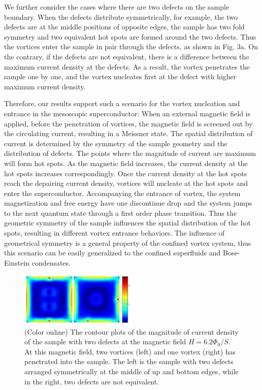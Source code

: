 \documentclass[aps,prl,showpacs,twocolumn]{revtex4}
\begin{document}
We further consider the cases where there are two defects on the
sample boundary. When the defects distribute symmetrically, for
example, the two defects are at the middle positions of opposite
edges, the sample has two fold symmetry and two equivalent hot spots
are formed around the two defects. Thus the vortices enter the
sample in pair through the defects, as shown in Fig. 3a. On the
contrary, if the defects are not equivalent, there is a difference
between the maximum current density at the defects. As a result, the
vortex penetrates the sample one by one, and the vortex nucleates
first at the defect with higher maximum current density.

Therefore, our results support such a scenario for the vortex
nucleation and entrance in the mesoscopic superconductor: When an
external magnetic field is applied, before the penetration of
vortices, the magnetic field is screened out by the circulating
current, resulting in a Meissner state. The spatial distribution of
current is determined by the symmetry of the sample geometry and the
distribution of defects. The points where the magnitude of current
are maximum will form hot spots. As the magnetic field increases,
the current density at the hot spots increases correspondingly. Once
the current density at the hot spots reach the depairing current
density, vortices will nucleate at the hot spots and enter the
superconductor. Accompanying the entrance of vortex, the system
magnetization and free energy have one discontinue drop and the
system jumps to the next quantum state through a first order phase
transition. Thus the geometric symmetry of the sample influences the
spatial distribution of the hot spots, resulting in different vortex
entrance behaviors. The influence of geometrical symmetry is a
general property of the confined vortex system, thus this scenario
can be easily generalized to the confined superfluids and
Bose-Einstein condensates.



\begin{figure}[tbp]
\centering
\renewcommand{\figurename}{FIG. }
\includegraphics[width=0.5\textwidth]{Fig3.eps}
\caption{(Color online) The contour plots of the magnitude of
current density of the sample with two defects at the magnetic field
$H=6.2\Phi_0/S$. At this magnetic field, two vortices (left) and one
vortex (right) has penetrated into the sample. The left is the
sample with two defects arranged symmetrically at the middle of up
and bottom edges, while in the right, two defects are not
equivalent.}
\end{figure}
\end{document}
